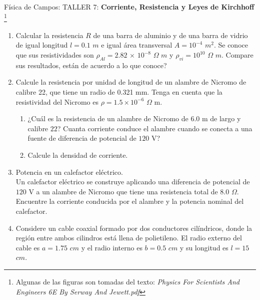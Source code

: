 \documentclass[12pt]{article}
\begin{document}
\pagestyle{empty}
\sffamily


Física de Campos: TALLER 7: \textbf{Corriente, Resistencia y Leyes de Kirchhoff}
\footnote{Algunas de las figuras son tomadas del texto: \textit{Physics For Scientists And Engineers 6E By Serway And Jewett.pdf}}

\hrulefill

\begin{enumerate} 

\item Calcular la resistencia $R$ de una barra de aluminio y de una barra de vidrio  de igual longitud $l=0.1$ $m$ e igual área transversal $A=10^{-4}$ $m^{2}$. Se conoce que sus resistividades son $\rho_{Al}=2.82$ $\times$ $10^{-8}$ $\Omega$ $m$ y $\rho_{vi}=10^{10}$ $\Omega$ $m$. Compare sus resultados, están de acuerdo a lo que conoce?

\item Calcule la resistencia por unidad de longitud de un alambre de Nicromo de calibre 22, que tiene un radio de 0.321 mm. Tenga en cuenta que la resistividad del Nicromo es $\rho=1.5\times 10^{-6}$ $\Omega$ m.
\begin{enumerate}
\item ¿Cuál es la resistencia de un alambre de Nicromo de $6.0$ m de largo y calibre $22$? Cuanta corriente conduce el alambre cuando se conecta a una fuente de diferencia de potencial de $120$ V?
\item Calcule la densidad de corriente.
\end{enumerate}

\item Potencia en un calefactor eléctrico.\\
Un calefactor eléctrico se construye aplicando una diferencia de potencial de $120$ V a un alambre de Nicromo que tiene una resistencia total de $8.0$ $\Omega$. Encuentre la corriente conducida por el alambre y la potencia nominal del calefactor.

\item Considere un cable coaxial formado por dos conductores cilíndricos, donde la región entre ambos cilindros está llena de polietileno. El radio externo del cable es $a=1.75$ $cm$ y el radio interno es $b=0.5$ $cm$ y su longitud es $l=15$ $cm$.


\end{enumerate}
\end{document}
